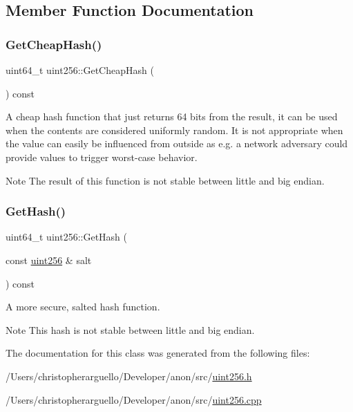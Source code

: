 \subsection{Member Function Documentation}
\mbox{\label{classuint256_a9baaa679dcc862e37e8b6c63a15c8c11}} 
\subsubsection{\texorpdfstring{Get\+Cheap\+Hash()}{GetCheapHash()}}
{\footnotesize\ttfamily uint64\+\_\+t uint256\+::\+Get\+Cheap\+Hash (\begin{DoxyParamCaption}{ }\end{DoxyParamCaption}) const\hspace{0.3cm}{\ttfamily [inline]}}

A cheap hash function that just returns 64 bits from the result, it can be used when the contents are considered uniformly random. It is not appropriate when the value can easily be influenced from outside as e.\+g. a network adversary could provide values to trigger worst-\/case behavior. \begin{DoxyNote}{Note}
The result of this function is not stable between little and big endian. 
\end{DoxyNote}
\mbox{\label{classuint256_a6dfa79998c7cb7def7a6c7c0a6915c58}} 
\subsubsection{\texorpdfstring{Get\+Hash()}{GetHash()}}
{\footnotesize\ttfamily uint64\+\_\+t uint256\+::\+Get\+Hash (\begin{DoxyParamCaption}\item[{const \mbox{\hyperlink{classuint256}{uint256}} \&}]{salt }\end{DoxyParamCaption}) const}

A more secure, salted hash function. \begin{DoxyNote}{Note}
This hash is not stable between little and big endian. 
\end{DoxyNote}


The documentation for this class was generated from the following files\+:\begin{DoxyCompactItemize}
\item 
/\+Users/christopherarguello/\+Developer/anon/src/\mbox{\hyperlink{uint256_8h}{uint256.\+h}}\item 
/\+Users/christopherarguello/\+Developer/anon/src/\mbox{\hyperlink{uint256_8cpp}{uint256.\+cpp}}\end{DoxyCompactItemize}
